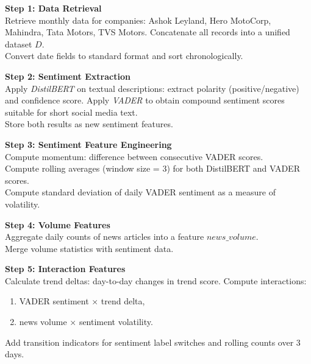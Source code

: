 \documentclass[pdflatex,sn-mathphys-num]{sn-jnl}%
\begin{document}
\begin{algorithm}[H]
\caption{Data Preprocessing Pipeline for Sentiment Analysis and Forecasting}
\BlankLine

\textbf{Step 1: Data Retrieval} \\
\Indp
Retrieve monthly data for companies: Ashok Leyland, Hero MotoCorp, Mahindra, Tata Motors, TVS Motors. Concatenate all records into a unified dataset $D$. \\
Convert date fields to standard format and sort chronologically. \\
\Indm

\textbf{Step 2: Sentiment Extraction} \\
\Indp
Apply \textit{DistilBERT} on textual descriptions: extract polarity (positive/negative) and confidence score. Apply \textit{VADER} to obtain compound sentiment scores suitable for short social media text. \\
Store both results as new sentiment features. \\
\Indm

\textbf{Step 3: Sentiment Feature Engineering} \\
\Indp
Compute momentum: difference between consecutive VADER scores. \\
Compute rolling averages (window size = 3) for both DistilBERT and VADER scores. \\
Compute standard deviation of daily VADER sentiment as a measure of volatility. \\
\Indm

\textbf{Step 4: Volume Features} \\
\Indp
Aggregate daily counts of news articles into a feature $news\_volume$. \\
Merge volume statistics with sentiment data. \\
\Indm

\textbf{Step 5: Interaction Features} \\
Calculate trend deltas: day-to-day changes in trend score.
Compute interactions:
\begin{enumerate}
    \item VADER sentiment $\times$ trend delta,
    \item news volume $\times$ sentiment volatility.
\end{enumerate}
Add transition indicators for sentiment label switches and rolling counts over 3 days. \\


\end{algorithm}
\end{document}

